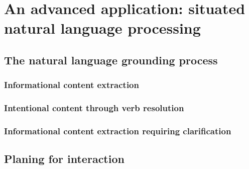 \chapter{An advanced application: situated natural language processing}
\label{chapter|dialogs}

\section{The natural language grounding process}
\label{sect|dialogs}

\subsection{Informational content extraction}
\subsection{Intentional content through verb resolution}
\subsection{Informational content extraction requiring clarification}
\label{dialogs|disamb}

\section{Planing for interaction}
\label{sect|planing-for-interaction}


